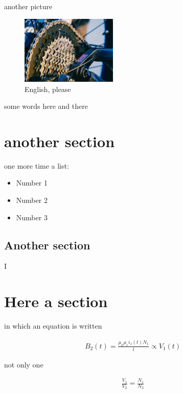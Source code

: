 \documentclass[17pt]{extarticle}
\begin{document}
another picture


\begin{figure}[h!]		
	\centering
   	\includegraphics[width=1.8in]{coppiaAlta.png}%
  	\caption{English, please}
   	\label{fig:graficoST_unAcce}
\end{figure}

some words here and there



\section{another section}

one more time a list:

\begin{itemize}
	\item Number 1
	\item Number 2
	\item Number 3
\end{itemize}





\subsection{Another section}

I

\clearpage










\section{Here a section}

in which an equation is written

\begin{eqnarray}
	B_2(t) = \frac{\mu_0\mu_r i_1(t)N_1}{l}\propto V_1(t)
\end{eqnarray}

not only one

\begin{eqnarray}
	\frac{V_1}{V_2} = \frac{N_1}{N_2}
\end{eqnarray}
\end{document}

